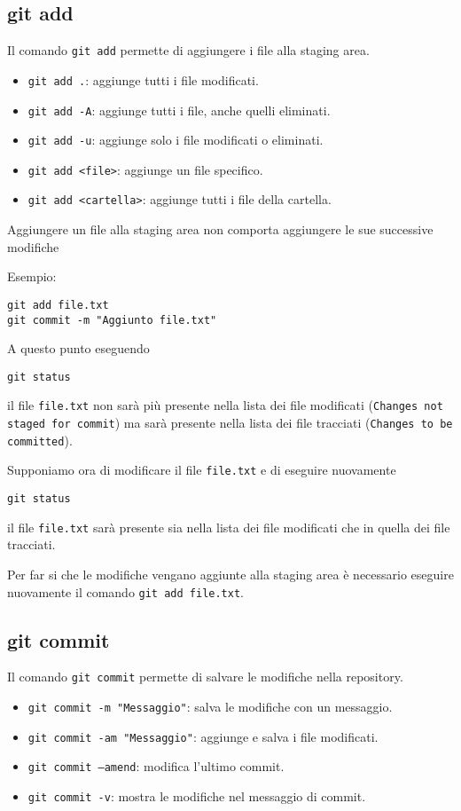 \documentclass{article}
\begin{document}
\subsection{git add}
Il comando \texttt{git add} permette di aggiungere i file alla staging area.
\begin{itemize}
    \item \texttt{git add .}: aggiunge tutti i file modificati.
    \item \texttt{git add -A}: aggiunge tutti i file, anche quelli eliminati.
    \item \texttt{git add -u}: aggiunge solo i file modificati o eliminati.
    \item \texttt{git add <file>}: aggiunge un file specifico.
    \item \texttt{git add <cartella>}: aggiunge tutti i file della cartella.
\end{itemize}

\begin{highlight}
    Aggiungere un file alla staging area non comporta aggiungere le sue 
    successive modifiche
\end{highlight}

Esempio:
\begin{verbatim}
git add file.txt
git commit -m "Aggiunto file.txt"
\end{verbatim}    

A questo punto eseguendo
\begin{verbatim}
git status
\end{verbatim}
il file \texttt{file.txt} non sarà più presente nella lista dei file modificati 
(\texttt{Changes not staged for commit}) ma sarà presente nella lista dei file tracciati (\texttt{Changes to be committed}).

Supponiamo ora di modificare il file \texttt{file.txt} e di eseguire nuovamente
\begin{verbatim}
git status
\end{verbatim}
il file \texttt{file.txt} sarà presente sia nella lista dei file modificati 
 che in quella dei file tracciati.

Per far si che le modifiche vengano aggiunte alla staging area è necessario
eseguire nuovamente il comando \texttt{git add file.txt}.

\subsection{git commit}
Il comando \texttt{git commit} permette di salvare le modifiche nella repository.
\begin{itemize}
    \item \texttt{git commit -m "Messaggio"}: salva le modifiche con un messaggio.
    \item \texttt{git commit -am "Messaggio"}: aggiunge e salva i file modificati.
    \item \texttt{git commit --amend}: modifica l'ultimo commit.
    \item \texttt{git commit -v}: mostra le modifiche nel messaggio di commit.
\end{itemize}
\end{document}

